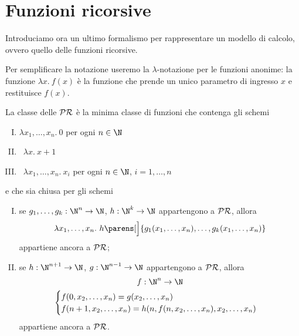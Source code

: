 \section{Funzioni ricorsive}

Introduciamo ora un ultimo formalismo per rappresentare un modello di calcolo, ovvero quello delle funzioni ricorsive.

Per semplificare la notazione useremo la $\lambda$-notazione per le funzioni anonime: la funzione $\lambda x.\ f(x)$ è la funzione che prende un unico parametro di ingresso $x$ e restituisce $f(x)$.   

\begin{definition}
    La classe delle  $\mathcal{PR}$ è la minima classe di funzioni che contenga gli schemi
    \begin{enumerate}[I.]
        \item {} \qquad\qquad $\lambda x_1, \dots, x_n.\ 0$ \quad per ogni $n \in \N$ 
        \item {} \quad\, $\lambda x.\ x+1$
        \item {} \quad\, $\lambda x_1, \dots, x_n.\ x_i$ \quad per ogni $n \in \N$, $i = 1, \dots, n$
    \end{enumerate}
    e che sia chiusa per gli schemi
    \begin{enumerate}[I., start=4]
        \item {} se $g_1, \dots, g_k : \N^n \to \N$, $h : \N^k \to \N$ appartengono a $\mathcal{PR}$, allora \[
            \lambda x_1, \dots, x_n.\ h\parens[\Big]{g_1(x_1, \dots, x_n), \dots, g_k(x_1, \dots, x_n)}
        \] appartiene ancora a $\mathcal{PR}$;
        \item {} se $h : \N^{n+1} \to \N$, $g : \N^{n-1} \to \N$ appartengono a $\mathcal{PR}$, allora \begin{gather*}
            f : \N^n \to \N \\
            \begin{cases}
                f(0, x_2, \dots, x_n) = g(x_2, \dots, x_n)\\
                f(n+1, x_2, \dots, x_n) = h(n, f(n, x_2, \dots, x_n), x_2, \dots, x_n)
            \end{cases}
        \end{gather*}   
        appartiene ancora a $\mathcal{PR}$. 
    \end{enumerate}
\end{definition}

